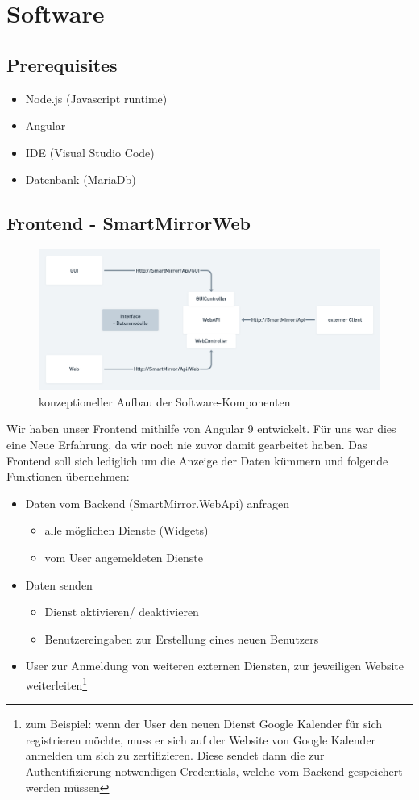 \section{Software}\label{Software}
\subsection{Prerequisites}
\begin{itemize}
\item Node.js (Javascript runtime)
\item Angular
\item IDE (Visual Studio Code)
\item Datenbank (MariaDb)
\end{itemize}

\subsection{Frontend - SmartMirrorWeb}
\begin{figure}[h]
\centering
\includegraphics[width=120mm]{pictures/Frontend2.png}
\caption{konzeptioneller Aufbau der Software-Komponenten}
\end{figure}
Wir haben unser Frontend mithilfe von Angular 9 entwickelt. Für uns war dies eine Neue Erfahrung, da wir noch nie zuvor damit gearbeitet haben. Das Frontend soll sich lediglich um die Anzeige der Daten kümmern und folgende Funktionen übernehmen:
\begin{itemize}
\item Daten vom Backend (SmartMirror.WebApi) anfragen
\begin{itemize}
\item alle möglichen Dienste (Widgets)
\item vom User angemeldeten Dienste
\end{itemize}
\item Daten senden
\begin{itemize}
\item Dienst aktivieren/ deaktivieren
\item Benutzereingaben zur Erstellung eines neuen Benutzers
\end{itemize}
\item User zur Anmeldung von weiteren externen Diensten, zur jeweiligen Website weiterleiten\footnote{zum Beispiel: wenn der User den neuen Dienst Google Kalender für sich registrieren möchte, muss er sich auf der Website von Google Kalender anmelden um sich zu zertifizieren. Diese sendet dann die zur Authentifizierung notwendigen Credentials, welche vom Backend gespeichert werden müssen }
\end{itemize} 
